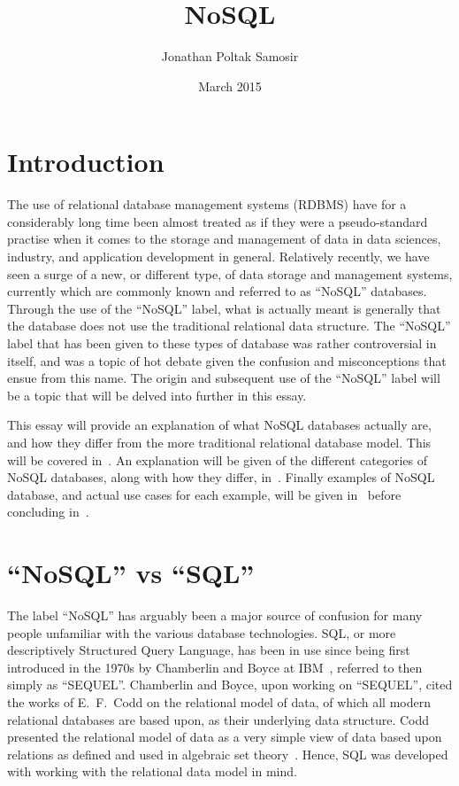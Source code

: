 \documentclass{article}
\title{NoSQL}
\author{Jonathan Poltak Samosir}
\date{March 2015}
\begin{document}


\section{Introduction} %
\label{sec:introduction}

The use of relational database management systems (RDBMS) have for a considerably long time been almost
treated as if they were a pseudo-standard practise when it comes to the storage and management of data
in data sciences, industry, and application development in general. Relatively recently, we have seen a surge of a new, or different type, of data
storage and management systems, currently which are commonly known and referred to as ``NoSQL'' databases.
Through the use of the ``NoSQL'' label, what is actually meant is generally that the database does not use
the traditional relational data structure. The
``NoSQL'' label that has been given to these types of database was rather controversial in itself, and was
a topic of hot debate given the confusion and misconceptions that ensue from this name. The origin and subsequent use of the ``NoSQL'' label
will be a topic that will be delved into further in this essay.

This essay will provide an explanation of what NoSQL databases actually are, and how they differ from the more
traditional relational database model. This will be covered in~. An explanation will be given of
the different categories of NoSQL databases, along with how they differ, in~.
Finally examples of NoSQL database, and actual use cases for each example, will be given in~
before concluding in~.



\section{``NoSQL'' vs ``SQL''} %
\label{sec:nosql_sql}

The label ``NoSQL'' has arguably been a major source of confusion for many people unfamiliar with the various database
technologies. SQL, or more descriptively Structured Query Language, has been in use since being first
introduced in the 1970s by Chamberlin and Boyce at IBM~\cite{chamberlin1974sequel}, referred to then simply as
``SEQUEL''. Chamberlin and Boyce, upon working on ``SEQUEL'', cited the works of E.\ F.\ Codd on the relational model of data, of
which all modern relational databases are based upon, as their underlying data structure. Codd presented
the relational model of data as a very simple view of data based upon relations as defined and used in
algebraic set theory~\cite{codd1970relational}. Hence, SQL was developed with working with the relational data model
in mind.
\end{document}
